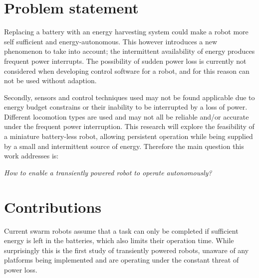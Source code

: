 \newpage

\section{Problem statement}



Replacing a battery with an energy harvesting system could make a robot more self sufficient and energy-autonomous. 
This however introduces a new phenomenon to take into account; the intermittent availability of energy produces frequent power interrupts.
The possibility of sudden power loss is currently not considered when developing control software for a robot, and for this reason can not be used without adaption.
\hfill \break

Secondly, sensors and control techniques used may not be found applicable due to energy budget constrains or their inability to be interrupted by a loss of power. %
Different locomotion types are used and may not all be reliable and/or accurate under the frequent power interruption.
This research will explore the feasibility of a miniature battery-less robot, allowing persistent operation while being supplied by a small and intermittent source of energy.
Therefore the main question this work addresses is:

\begin{center}
	\textit{How to enable a transiently powered robot to operate autonomously?}
\end{center}

\section{Contributions}
Current swarm robots assume that a task can only be completed if sufficient energy is left in the batteries, which also limits their operation time. 
While surprisingly this is the first study of transiently powered robots, unaware of any platforms being implemented and are operating under the constant threat of power loss. 


